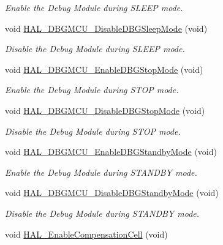 \begin{DoxyCompactItemize}
\begin{DoxyCompactList}\small\item\em Enable the Debug Module during S\+L\+E\+EP mode. \end{DoxyCompactList}\item 
void \hyperlink{group___h_a_l___exported___functions___group2_gac7820d0561f19999a68d714655b901b5}{H\+A\+L\+\_\+\+D\+B\+G\+M\+C\+U\+\_\+\+Disable\+D\+B\+G\+Sleep\+Mode} (void)
\begin{DoxyCompactList}\small\item\em Disable the Debug Module during S\+L\+E\+EP mode. \end{DoxyCompactList}\item 
void \hyperlink{group___h_a_l___exported___functions___group2_gadf25043b17de4bef38a95a75fd03e5c4}{H\+A\+L\+\_\+\+D\+B\+G\+M\+C\+U\+\_\+\+Enable\+D\+B\+G\+Stop\+Mode} (void)
\begin{DoxyCompactList}\small\item\em Enable the Debug Module during S\+T\+OP mode. \end{DoxyCompactList}\item 
void \hyperlink{group___h_a_l___exported___functions___group2_ga2c93dcee35e5983d74f1000de7c042d5}{H\+A\+L\+\_\+\+D\+B\+G\+M\+C\+U\+\_\+\+Disable\+D\+B\+G\+Stop\+Mode} (void)
\begin{DoxyCompactList}\small\item\em Disable the Debug Module during S\+T\+OP mode. \end{DoxyCompactList}\item 
void \hyperlink{group___h_a_l___exported___functions___group2_ga28a1323b2eeb0a408c1cfdbfa0db5ead}{H\+A\+L\+\_\+\+D\+B\+G\+M\+C\+U\+\_\+\+Enable\+D\+B\+G\+Standby\+Mode} (void)
\begin{DoxyCompactList}\small\item\em Enable the Debug Module during S\+T\+A\+N\+D\+BY mode. \end{DoxyCompactList}\item 
void \hyperlink{group___h_a_l___exported___functions___group2_ga7faa58d8508ea3123b9f247a70379779}{H\+A\+L\+\_\+\+D\+B\+G\+M\+C\+U\+\_\+\+Disable\+D\+B\+G\+Standby\+Mode} (void)
\begin{DoxyCompactList}\small\item\em Disable the Debug Module during S\+T\+A\+N\+D\+BY mode. \end{DoxyCompactList}\item 
void \hyperlink{group___h_a_l___exported___functions___group2_ga20b6ca07582e10aec5e15ad2fda7dfc1}{H\+A\+L\+\_\+\+Enable\+Compensation\+Cell} (void)

\end{DoxyCompactItemize}
